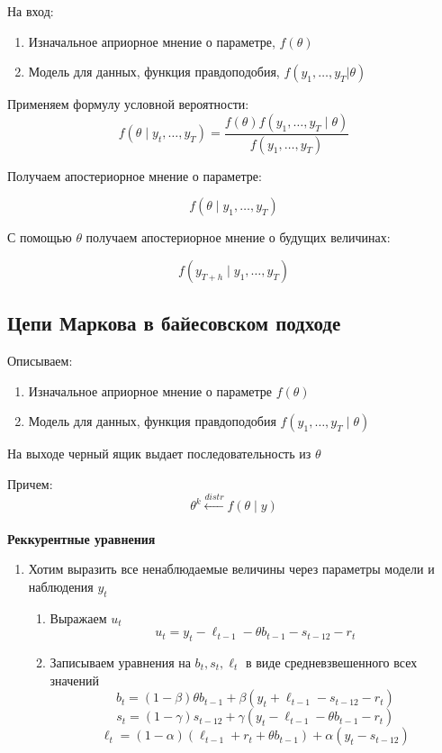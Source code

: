 \documentclass[a4paper, 12pt]{article}
\begin{document}
На вход:
\begin{enumerate}
    \item Изначальное априорное мнение о параметре, $f(\theta)$
    \item Модель для данных, функция правдоподобия, $f(y_{1}, \ldots, y_{T}|\theta)$
\end{enumerate}

Применяем формулу условной вероятности:
\[f(\theta \mid y_{t}, \ldots, y_{T}) = \frac{f(\theta)f(y_{1}, \ldots, y_{T} \mid \theta)}{f(y_{1}, \ldots, y_{T})}\]

Получаем апостериорное мнение о параметре:

\[f(\theta \mid y_{1}, \ldots, y_{T})\]

С помощью $\theta$ получаем апостериорное мнение о будущих величинах:

\[f(y_{T + h} \mid y_{1}, \ldots, y_{T})\]

\subsection{Цепи Маркова в байесовском подходе}

Описываем:

\begin{enumerate}
    \item Изначальное априорное мнение о параметре $f(\theta)$
    \item Модель для данных, функция правдоподобия $f(y_{1}, \ldots, y_{T} \mid \theta)$
\end{enumerate}

На выходе черный ящик выдает последовательность из $\theta$

Причем: 
\[\theta^{k} \xleftarrow[]{distr} f(\theta \mid y)\]

\textbf{Реккурентные уравнения}

\begin{enumerate}
  \item Хотим выразить все ненаблюдаемые величины через параметры модели и наблюдения $y_t$
  \begin{enumerate}
    \item Выражаем $u_t$ 
      \[u_t = y_t - \ell_{t - 1} - \theta b_{t-1} - s_{t - 12} - r_t\]
    \item Записываем уравнения на $b_t, s_t, \ell_t$ в виде средневзвешенного всех значений
     \[b_t = (1 - \beta)\theta b_{t - 1} + \beta (y_t + \ell_{t - 1} - s_{t-12} - r_t)\]
     \[s_t = (1 - \gamma) s_{t - 12} + \gamma (y_t - \ell_{t - 1} - \theta b_{t - 1} - r_t)\]
     \[\ell_t = (1 - \alpha) (\ell_{t-1} + r_t + \theta b_{t - 1}) + \alpha(y_t - s_{t - 12})\]
  \end{enumerate}
\end{enumerate}
\end{document}
